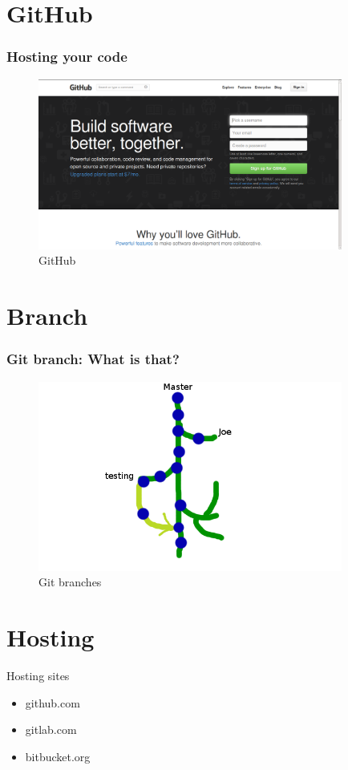 \documentclass[bigger, presentation]{beamer}
\begin{document}
\section{GitHub}
\label{sec-10}
\begin{frame}
\frametitle{Hosting your code}
\label{sec-10-1}



  \begin{figure}[htb]
  \centering
  \includegraphics[width=10cm,angle=0]{./github.png}
  \caption{\label{fig:GitHub}GitHub}
  \end{figure}
\end{frame}
\section{Branch}
\label{sec-11}
\begin{frame}
\frametitle{Git branch: What is that?}
\label{sec-11-1}



  \begin{figure}[htb]
  \centering
  \includegraphics[width=10cm,angle=0]{./branch.png}
  \caption{\label{fig:branch}Git branches}
  \end{figure}
\end{frame}
\section{Hosting}
\label{sec-12}
\begin{frame}
\begin{block}{Hosting sites}
\label{sec-12-1-1}

\begin{itemize}
\item github.com
\item gitlab.com
\item bitbucket.org
\end{itemize}
     
\end{block}
\end{frame}
\end{document}
